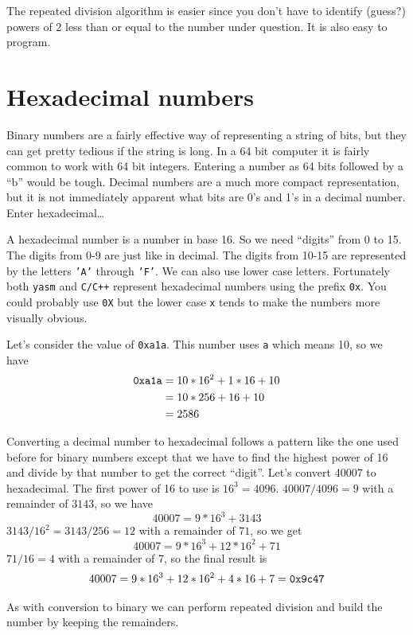 \documentclass[11pt,b5paper]{book}
\begin{document}
The repeated division algorithm is easier since you don't have to identify (guess?) powers of 2
less than or equal to the number under question.
It is also easy to program.

\section{Hexadecimal numbers}

Binary numbers are a fairly effective way of representing a string of bits,
but they can get pretty tedious if the string is long.
In a 64 bit computer it is fairly common to work with 64 bit integers.
Entering a number as 64 bits followed by a ``b'' would be tough.
Decimal numbers are a much more compact representation, but it is not
immediately apparent what bits are 0's and 1's in a decimal number.
Enter hexadecimal\ldots

A hexadecimal number is a number in base 16.
So we need ``digits'' from 0 to 15.
The digits from 0-9 are just like in decimal.
The digits from 10-15 are represented by the letters {\tt 'A'} through
{\tt 'F'}.  We can also use lower case letters.
Fortunately both {\tt yasm} and {\tt C/C++} represent hexadecimal numbers
using the prefix {\tt 0x}.
You could probably use {\tt 0X} but the lower case {\tt x} tends to make the
numbers more visually obvious.

Let's consider the value of {\tt 0xa1a}.
This number uses {\tt a} which means 10, so we have
\begin{align*}
{\tt 0xa1a} &= 10*16^2 + 1*16 + 10 \\
           &= 10*256 + 16 + 10 \\
           &= 2586
\end{align*}

Converting a decimal number to hexadecimal follows a pattern like the one used
before for binary numbers except that we have to find the highest power of 16
and divide by that number to get the correct ``digit''.
Let's convert 40007 to hexadecimal.
The first power of 16 to use is $16^3 = 4096$.
$40007/4096 = 9$ with a remainder of $3143$, so we have
$$40007 = 9*16^3 + 3143$$
$3143/16^2 = 3143/256 = 12$ with a remainder of $71$, so we get
$$40007 = 9*16^3 + 12*16^2 + 71$$
$71/16 = 4$ with a remainder of 7, so the final result is
$$40007 = 9*16^3 + 12*16^2 + 4*16 + 7 = {\tt 0x9c47}$$

As with conversion to binary we can perform repeated division and build the number by
keeping the remainders.
\end{document}
